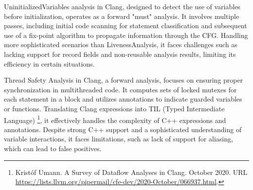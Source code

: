 UninitializedVariables analysis in Clang, designed to detect the use of variables before initialization, operates as a forward "must" analysis. It involves multiple passes, including initial code scanning for statement classification and subsequent use of a fix-point algorithm to propagate information through the CFG. Handling more sophisticated scenarios than LivenessAnalysis, it faces challenges such as lacking support for record fields and non-reusable analysis results, limiting its efficiency in certain situations.

Thread Safety Analysis in Clang, a forward analysis, focuses on ensuring proper synchronization in multithreaded code. It computes sets of locked mutexes for each statement in a block and utilizes annotations to indicate guarded variables or functions. Translating Clang expressions into TIL (Typed Intermediate Language) \footnote{Kristóf Umann. A Survey of Dataflow Analyses in Clang. October 2020. URL \url{https://lists.llvm.org/pipermail/cfe-dev/2020-October/066937.html}.}, it effectively handles the complexity of C++ expressions and annotations. Despite strong C++ support and a sophisticated understanding of variable interactions, it faces limitations, such as lack of support for aliasing, which can lead to false positives.









